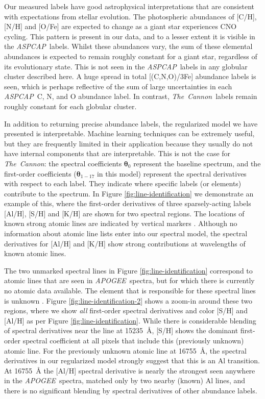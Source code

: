 \documentclass[12pt,preprint]{aastex6}
\newcommand{\project}[1]{\textsl{#1}}
\newcommand{\TheCannon}{\project{The~Cannon}}
\newcommand{\acronym}[1]{{\small{#1}}}
\newcommand{\apogee}{\project{\acronym{APOGEE}}}
\newcommand{\aspcap}{\project{\acronym{ASPCAP}}}
\newcommand{\Dvector}[1]{\boldsymbol{#1}}
\newcommand{\vectheta}{\Dvector{\theta}}
\begin{document}
Our measured labels have good astrophysical
interpretations that are consistent with expectations from stellar
evolution.  The photospheric abundances of [C/H], [N/H] and [O/Fe] 
are expected to change as a giant star experiences CNO cycling.  This pattern is
present in our data, and to a lesser extent it is visible in the
\aspcap\ labels.  Whilst these abundances vary, the sum of these
elemental abundances is expected to remain roughly constant for a
giant star, regardless of its evolutionary state.  This is not 
seen in the \aspcap\ labels in any globular cluster described here.  
A huge spread in total [(C,N,O)/3Fe] abundance labels is seen, 
which is perhaps reflective of the sum of large uncertainties in
each \aspcap\ C, N, and O abundance label.  In contrast, \TheCannon\
labels remain roughly constant for each globular cluster.


In addition to returning precise abundance labels, the regularized model
we have presented is interpretable.  Machine learning techniques can be extremely
useful, but they are frequently limited in their application because they
usually do not have internal components that are interpretable.  This is
not the case for \TheCannon: the spectral coefficients $\vectheta_0$
represent the baseline spectrum, and the first-order coefficients 
($\vectheta_{1-17}$ in this model) represent the spectral derivatives with
respect to each label.  They indicate where specific labels (or elements)
contribute to the spectrum.  In Figure \ref{fig:line-identification} we
demonstrate an example of this, where the first-order derivatives of three
sparsely-acting labels [Al/H], [S/H] and [K/H] are shown for two spectral
regions.  The locations of known strong atomic lines are indicated by vertical
markers \citep{Smith_2013}. Although no information about atomic line lists
enter into our spectral model, the spectral derivatives for [Al/H] and [K/H] 
show strong contributions at wavelengths of known atomic lines.


The two unmarked spectral lines in Figure \ref{fig:line-identification} correspond
to atomic lines that are seen in \apogee\ spectra, but for which there is
currently no atomic data available.  The element that
is responsible for these spectral lines is unknown \citep{Shetrone_2015}.
Figure \ref{fig:line-identification-2} shows a zoom-in around these
two regions, where we show \emph{all} first-order spectral derivatives and
color [S/H] and [Al/H] as per Figure \ref{fig:line-identification}.  While
there is considerable blending of spectral derivatives near the line at 15235~\AA{}, [S/H] shows
the dominant first-order spectral coefficient at all pixels that include
this (previously unknown) atomic line.  For the previously unknown atomic line
at 16755~\AA{}, the spectral derivatives in our regularized model strongly
suggest that this is an Al transition. At 16755~\AA{} the [Al/H] spectral derivative
is nearly the strongest seen anywhere in the \apogee\ spectra, matched only
by two nearby (known) Al lines, and there is no significant blending by
spectral derivatives of other abundance labels. 
\end{document}
